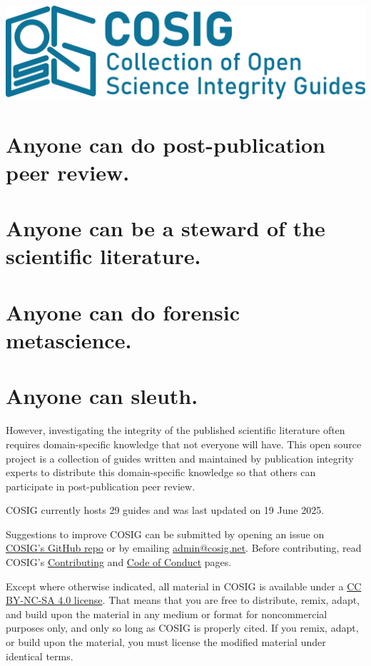 \documentclass[letterpaper, 12pt]{article}
\begin{document}
\flushleft
\includegraphics[width=\textwidth]{img/home/241017_final_logo_mockup.png}

\section*{Anyone can do post-publication peer review.}
\section*{Anyone can be a steward of the scientific literature.}
\section*{Anyone can do forensic metascience.}
\section*{Anyone can sleuth.}

However, investigating the integrity of the published scientific literature often requires domain-specific knowledge that not everyone will have. This open source project is a collection of guides written and maintained by publication integrity experts to distribute this domain-specific knowledge so that others can participate in post-publication peer review.

COSIG currently hosts 29 guides and was last updated on 19 June 2025.

Suggestions to improve COSIG can be submitted by opening an issue on \href{https://github.com/cosig-pppr/cosig/issues}{COSIG's GitHub repo} or by emailing \href{mailto:admin@cosig.net}{admin@cosig.net}. Before contributing, read COSIG's \href{https://github.com/cosig-pppr/cosig/blob/main/CONTRIBUTING.md}{Contributing} and \href{https://github.com/cosig-pppr/cosig/blob/main/CODE_OF_CONDUCT.md}{Code of Conduct} pages.

Except where otherwise indicated, all material in COSIG is available under a \href{https://creativecommons.org/licenses/by-nc-sa/4.0/deed.en}{CC BY-NC-SA 4.0 license}. That means that you are free to distribute, remix, adapt, and build upon the material in any medium or format for noncommercial purposes only, and only so long as COSIG is properly cited. If you remix, adapt, or build upon the material, you must license the modified material under identical terms.
\end{document}

